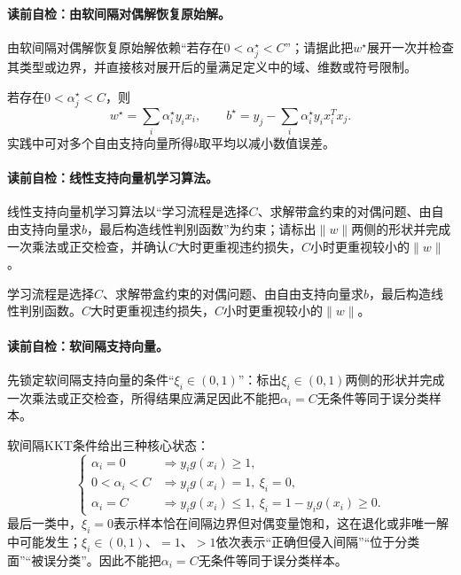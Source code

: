 \paragraph{读前自检：由软间隔对偶解恢复原始解。}由软间隔对偶解恢复原始解依赖“若存在$0<\alpha_j^\star<C$”；请据此把$w^\star$展开一次并检查其类型或边界，并直接核对展开后的量满足定义中的域、维数或符号限制。\par

若存在$0<\alpha_j^\star<C$，则
\[
w^\star=\sum_i\alpha_i^\star y_ix_i,\qquad
b^\star=y_j-\sum_i\alpha_i^\star y_ix_i^Tx_j.
\]
实践中可对多个自由支持向量所得$b$取平均以减小数值误差。

\paragraph{读前自检：线性支持向量机学习算法。}线性支持向量机学习算法以“学习流程是选择$C$、求解带盒约束的对偶问题、由自由支持向量求$b$，最后构造线性判别函数”为约束；请标出$\lVert w\rVert$两侧的形状并完成一次乘法或正交检查，并确认$C$大时更重视违约损失，$C$小时更重视较小的$\lVert w\rVert$。\par

学习流程是选择$C$、求解带盒约束的对偶问题、由自由支持向量求$b$，最后构造线性判别函数。$C$大时更重视违约损失，$C$小时更重视较小的$\lVert w\rVert$。

\paragraph{读前自检：软间隔支持向量。}先锁定软间隔支持向量的条件“$\xi_i\in(0,1)$”：标出$\xi_i\in(0,1)$两侧的形状并完成一次乘法或正交检查，所得结果应满足因此不能把$\alpha_i=C$无条件等同于误分类样本。\par

软间隔KKT条件给出三种核心状态：
\[
\begin{cases}
\alpha_i=0 &\Rightarrow y_ig(x_i)\geq1,\\
0<\alpha_i<C &\Rightarrow y_ig(x_i)=1,\ \xi_i=0,\\
\alpha_i=C &\Rightarrow y_ig(x_i)\leq1,\ \xi_i=1-y_ig(x_i)\geq0.
\end{cases}
\]
最后一类中，$\xi_i=0$表示样本恰在间隔边界但对偶变量饱和，这在退化或非唯一解中可能发生；$\xi_i\in(0,1)$、$=1$、$>1$依次表示“正确但侵入间隔”“位于分类面”“被误分类”。因此不能把$\alpha_i=C$无条件等同于误分类样本。


